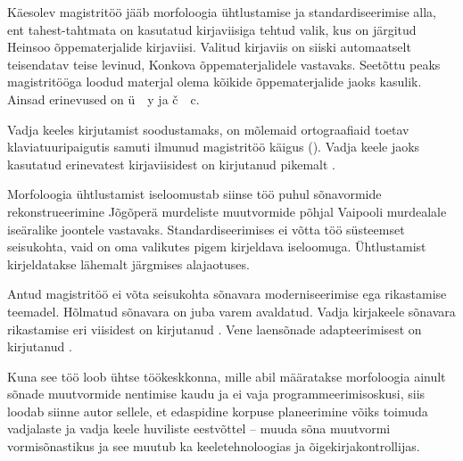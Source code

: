 \documentclass[12pt,a4paper]{article}
\begin{document}
Käesolev magistritöö jääb morfoloogia ühtlustamise ja standardiseerimise alla, ent tahest-tahtmata on kasutatud kirjaviisiga tehtud valik, kus on järgitud Heinsoo õppematerjalide kirjaviisi. Valitud kirjaviis on siiski automaatselt teisendatav teise levinud, Konkova õppematerjalidele vastavaks. Seetõttu peaks magistri\-tööga loodud materjal olema kõikide õppematerjalide jaoks kasulik. Ainsad erinevused on ü~\textrightarrow~y ja č~\textrightarrow~c. %

Vadja keeles kirjutamist soodustamaks, on mõlemaid ortograafiaid toetav klaviatuuri\-paigutis samuti ilmunud magistritöö käigus (\cite{kankainen_annõmmõ_2019}). Vadja keele jaoks kasutatud erinevatest kirjaviisidest on kirjutanud pikemalt \cite{ernits_vadja_2010}.

Morfoloogia ühtlustamist iseloomustab siinse töö puhul sõnavormide rekonstrueerimine Jõgõperä murdeliste muutvormide põhjal Vaipooli murdealale iseäralike joontele vastavaks. Standardiseerimises ei võtta töö süsteemset seisukohta, vaid on oma valikutes pigem kirjeldava iseloomuga. Ühtlustamist kirjeldatakse lähemalt järgmises alajaotuses.

Antud magistritöö ei võta seisukohta sõnavara moderniseerimise ega rikastamise teemadel. Hõlmatud sõnavara on juba varem avaldatud. Vadja kirja\-keele sõnavara rikastamise eri viisidest on kirjutanud \cite{ernits_vadja_2010}.
Vene laensõnade adapteerimisest on kirjutanud \cite{rozhanskiy_zaimstvovannyje_2009}.


Kuna see töö loob ühtse töökeskkonna, mille abil määratakse morfoloogia ainult sõnade muut\-vormide nentimise kaudu ja ei vaja programmeerimisoskusi, siis loodab siinne autor sellele, et edaspidine korpuse planeerimine võiks toimuda vadjalaste ja vadja keele huviliste eestvõttel -- muuda sõna muutvormi vormisõnastikus ja see muutub ka keele\-tehnoloogias ja õige\-kirja\-kontrollijas.
\end{document}
